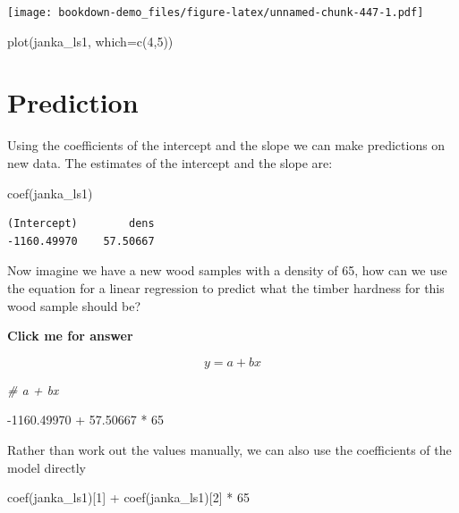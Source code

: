 \documentclass[
]{book}
\newenvironment{Shaded}{\begin{snugshade}}{\end{snugshade}}
\newcommand{\AttributeTok}[1]{\textcolor[rgb]{0.77,0.63,0.00}{#1}}
\newcommand{\CommentTok}[1]{\textcolor[rgb]{0.56,0.35,0.01}{\textit{#1}}}
\newcommand{\DecValTok}[1]{\textcolor[rgb]{0.00,0.00,0.81}{#1}}
\newcommand{\FloatTok}[1]{\textcolor[rgb]{0.00,0.00,0.81}{#1}}
\newcommand{\FunctionTok}[1]{\textcolor[rgb]{0.00,0.00,0.00}{#1}}
\newcommand{\NormalTok}[1]{#1}
\newcommand{\SpecialCharTok}[1]{\textcolor[rgb]{0.00,0.00,0.00}{#1}}
\begin{document}
\texttt{[image: bookdown-demo\_files/figure-latex/unnamed-chunk-447-1.pdf]}

\begin{Shaded}
\begin{Highlighting}[]
\FunctionTok{plot}\NormalTok{(janka\_ls1, }\AttributeTok{which=}\FunctionTok{c}\NormalTok{(}\DecValTok{4}\NormalTok{,}\DecValTok{5}\NormalTok{))}
\end{Highlighting}
\end{Shaded}

\hypertarget{prediction}{%
\section{Prediction}\label{prediction}}

Using the coefficients of the intercept and the slope we can make predictions on new data.
The estimates of the intercept and the slope are:

\begin{Shaded}
\begin{Highlighting}[]
\FunctionTok{coef}\NormalTok{(janka\_ls1)}
\end{Highlighting}
\end{Shaded}

\begin{verbatim}
(Intercept)        dens 
-1160.49970    57.50667
\end{verbatim}

Now imagine we have a new wood samples with a density of 65, how can we use the equation for a linear regression to predict what the timber hardness for this wood sample should be?

\textbf{Click me for answer}

\[ y = a + bx \]

\begin{Shaded}
\begin{Highlighting}[]
\CommentTok{\# a + bx}

\SpecialCharTok{{-}}\FloatTok{1160.49970} \SpecialCharTok{+} \FloatTok{57.50667} \SpecialCharTok{*} \DecValTok{65}
\end{Highlighting}
\end{Shaded}

Rather than work out the values manually, we can also use the coefficients of the model directly

\begin{Shaded}
\begin{Highlighting}[]
\FunctionTok{coef}\NormalTok{(janka\_ls1)[}\DecValTok{1}\NormalTok{] }\SpecialCharTok{+} \FunctionTok{coef}\NormalTok{(janka\_ls1)[}\DecValTok{2}\NormalTok{] }\SpecialCharTok{*} \DecValTok{65}
\end{Highlighting}
\end{Shaded}
\end{document}
